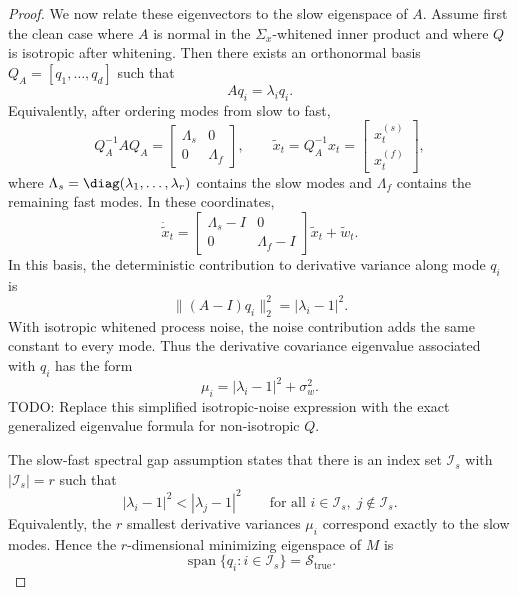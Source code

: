 \begin{proof}
We now relate these eigenvectors to the slow eigenspace of $A$. Assume first
the clean case where $A$ is normal in the $\Sigma_x$-whitened inner product and
where $Q$ is isotropic after whitening. Then there exists an orthonormal basis
$Q_A=[q_1,\ldots,q_d]$ such that
\begin{equation}
    A q_i = \lambda_i q_i.
\end{equation}
Equivalently, after ordering modes from slow to fast,
\begin{equation}
    Q_A^{-1} A Q_A
    =
    \begin{bmatrix}
        \Lambda_s & 0 \\
        0 & \Lambda_f
    \end{bmatrix},
    \qquad
    \tilde{x}_t = Q_A^{-1}x_t
    =
    \begin{bmatrix}
        x_t^{(s)} \\
        x_t^{(f)}
    \end{bmatrix},
\end{equation}
where $\Lambda_s=\diag(\lambda_1,\ldots,\lambda_r)$ contains the slow modes
and $\Lambda_f$ contains the remaining fast modes. In these coordinates,
\begin{equation}
    \dot{\tilde{x}}_t
    =
    \begin{bmatrix}
        \Lambda_s-I & 0 \\
        0 & \Lambda_f-I
    \end{bmatrix}
    \tilde{x}_t
    +
    \tilde{w}_t.
\end{equation}
In this basis, the deterministic contribution to derivative variance along
mode $q_i$ is
\begin{equation}
    \|(A-I)q_i\|_2^2
    =
    |\lambda_i-1|^2.
\end{equation}
With isotropic whitened process noise, the noise contribution adds the same
constant to every mode. Thus the derivative covariance eigenvalue associated
with $q_i$ has the form
\begin{equation}
    \mu_i = |\lambda_i-1|^2 + \sigma_w^2.
    \label{eq:mode_derivative_variance}
\end{equation}
TODO: Replace this simplified isotropic-noise expression with the exact
generalized eigenvalue formula for non-isotropic $Q$.

The slow-fast spectral gap assumption states that there is an index set
$\mathcal{I}_s$ with $|\mathcal{I}_s|=r$ such that
\begin{equation}
    |\lambda_i-1|^2 < |\lambda_j-1|^2
    \qquad
    \text{for all } i \in \mathcal{I}_s,\; j \notin \mathcal{I}_s.
\end{equation}
Equivalently, the $r$ smallest derivative variances $\mu_i$ correspond exactly
to the slow modes. Hence the $r$-dimensional minimizing eigenspace of $M$ is
\begin{equation}
    \operatorname{span}\{q_i : i \in \mathcal{I}_s\}
    =
    \mathcal{S}_{\mathrm{true}}.
\end{equation}


\end{proof}
